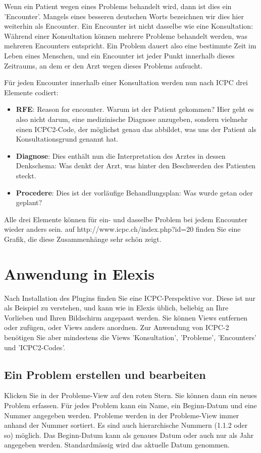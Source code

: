\documentclass[a4paper]{scrartcl}
\begin{document}
\medskip

Wenn ein Patient wegen eines Problems behandelt wird, dann ist dies ein 'Encounter'. Mangels eines besseren deutschen Worts bezeichnen wir dies hier weiterhin als Encounter. Ein Encounter ist nicht dasselbe wie eine Konsultation: Während einer Konsultation können mehrere Probleme behandelt werden, was mehreren Encounters entspricht. Ein Problem dauert also eine bestimmte Zeit im Leben eines Menschen, und ein Encounter ist jeder Punkt innerhalb dieses Zeitraums, an dem er den Arzt wegen dieses Problems aufsucht.

\medskip

Für jeden Encounter innerhalb einer Konsultation werden nun nach ICPC drei Elemente codiert:
\begin{itemize}
\item \textbf{RFE}: Reason for encounter. Warum ist der Patient gekommen? Hier geht es also nicht darum, eine medizinische Diagnose anzugeben, sondern vielmehr einen ICPC2-Code, der möglichst genau das abbildet, was uns der Patient als Konsultationsgrund genannt hat.
\item \textbf{Diagnose}: Dies enthält nun die Interpretation des Arztes in dessen Denkschema: Was denkt der Arzt, was hinter den Beschwerden des Patienten steckt.
\item \textbf{Procedere}: Dies ist der vorläufige Behandlungsplan: Was wurde getan oder geplant?
\end{itemize}

Alle drei Elemente können für ein- und dasselbe Problem bei jedem Encounter wieder anders sein. auf http://www.icpc.ch/index.php?id=20 finden Sie eine Grafik, die diese Zusammenhänge sehr schön zeigt.

\section{Anwendung in Elexis}
Nach Installation des Plugins finden Sie eine ICPC-Perspektive vor. Diese ist nur als Beispiel zu verstehen, und kann wie in Elexis üblich, beliebig an Ihre Vorlieben und Ihren Bildschirm angepasst werden. Sie können Views entfernen oder zufügen, oder Views anders anordnen.
Zur Anwendung von ICPC-2 benötigen Sie aber mindestens die Views 'Konsultation', 'Probleme', 'Encounters' und 'ICPC2-Codes'.

\subsection{Ein Problem erstellen und bearbeiten}
Klicken Sie in der Probleme-View auf den roten Stern. Sie können dann ein neues Problem erfassen. Für jedes Problem kann ein Name, ein Beginn-Datum und eine Nummer angegeben werden. Probleme werden in der Probleme-View immer anhand der Nummer sortiert. Es sind auch hierarchische Nummern (1.1.2 oder so) möglich. Das Beginn-Datum kann als genaues Datum oder auch nur als Jahr angegeben werden. Standardmässig wird das aktuelle Datum genommen.
\end{document}
